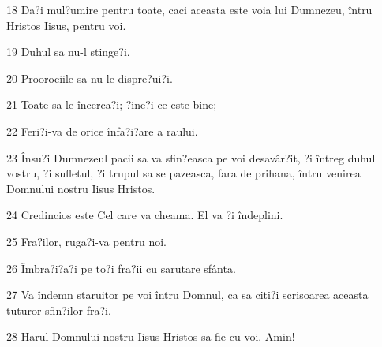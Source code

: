 \par 18 Da?i mul?umire pentru toate, caci aceasta este voia lui Dumnezeu, întru Hristos Iisus, pentru voi.
\par 19 Duhul sa nu-l stinge?i.
\par 20 Proorociile sa nu le dispre?ui?i.
\par 21 Toate sa le încerca?i; ?ine?i ce este bine;
\par 22 Feri?i-va de orice înfa?i?are a raului.
\par 23 Însu?i Dumnezeul pacii sa va sfin?easca pe voi desavâr?it, ?i întreg duhul vostru, ?i sufletul, ?i trupul sa se pazeasca, fara de prihana, întru venirea Domnului nostru Iisus Hristos.
\par 24 Credincios este Cel care va cheama. El va ?i îndeplini.
\par 25 Fra?ilor, ruga?i-va pentru noi.
\par 26 Îmbra?i?a?i pe to?i fra?ii cu sarutare sfânta.
\par 27 Va îndemn staruitor pe voi întru Domnul, ca sa citi?i scrisoarea aceasta tuturor sfin?ilor fra?i.
\par 28 Harul Domnului nostru Iisus Hristos sa fie cu voi. Amin!


